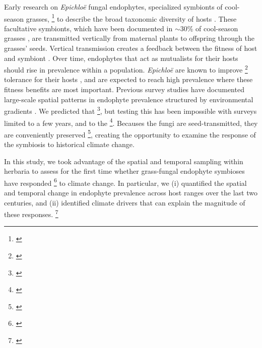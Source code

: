 \documentclass[11pt]{article}
\newcommand{\tom}[2]{{\color{red}{#1}}\footnote{\textit{\color{red}{#2}}}}
\begin{document}
Early research on \emph{Epichloë} fungal endophytes, specialized symbionts of cool-season grasses, \tom{used herbarium specimens}{I would move this later in the paragraph, where you can make the point that this approach has not been leveraged to its full capacity.} to describe the broad taxonomic diversity of hosts \citep{white1985endophyte}. 
These facultative symbionts, which have been documented in $\sim 30$\% of cool-season grasses \citep{leuchtmann1992systematics}, are transmitted vertically from maternal plants to offspring through the grasses' seeds.
Vertical transmission creates a feedback between the fitness of host and symbiont \citep{fine1975vectors, douglas1998host, rudgers2009fungus}. 
Over time, endophytes that act as mutualists for their hosts should rise in prevalence within a population. 
\emph{Epichloë} are known to improve \tom{drought}{not just drought - also herbivory and pathogens. I would cite more to support the types of endo benefits.} tolerance for their hosts \citep{afkhami2014mutualist}, and are expected to reach high prevalence where these fitness benefits are most important.
Previous survey studies have documented large-scale spatial patterns in  endophyte prevalence structured by environmental gradients \citep{granath2007variation,bazely2007broad, afkhami2012fungal,sneck2017variation}.
We predicted that \tom{prevalence should also track temporal changes in environmental drivers}{explain and elaborate}, but testing this has been impossible with surveys limited to a few years, and to the \tom{spatial extent reachable during a single growing season}{we have cars and planes so this should not be an obstacle. I think the real limitation is the combination spatio-temporal coverage, which is what herbaria uniquely provide}. 
Becauses the fungi are seed-transmitted, they are conveniently preserved \tom{along with their host plants on herbarium sheets}{as long as the specimen has seeds, which is almost always the case for grasses}, creating the opportunity to examine the response of the symbiosis to historical climate change.

In this study, we took advantage of the spatial and temporal sampling within herbaria to assess for the first time whether grass-fungal endophyte symbioses have responded \tom{adaptively}{the adaptive nature of the response needs to be explained} to climate change. In particular, we (i) quantified the spatial and temporal change in endophyte prevalence across host ranges over the last two centuries, and (ii) identified climate drivers that can explain the magnitude of these responses. \tom{}{This paragraph would benefit from a specific hypothesis or question, which I think you have. Your emphasis on space vs time is a little muddled. You frame the paper around climate change, but part of your analysis - I think - is asking a purely spatial question. This paragraph should also mention the three host species and provide some wow-factor summary stats on the range of years, locations, and sample sizes.}
	
\end{document}
